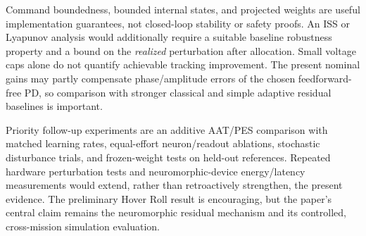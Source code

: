 \documentclass[letterpaper,10pt,conference]{IEEEtran}
\begin{document}
Command boundedness, bounded internal states, and projected weights are
useful implementation guarantees, not closed-loop stability or safety
proofs. An ISS or Lyapunov analysis would additionally require a suitable
baseline robustness property and a bound on the \emph{realized} perturbation
after allocation. Small voltage caps alone do not quantify achievable
tracking improvement. The present nominal gains may partly compensate
phase/amplitude errors of the chosen feedforward-free PD, so comparison
with stronger classical and simple adaptive residual baselines is important.

Priority follow-up experiments are an additive AAT/PES comparison with
matched learning rates, equal-effort neuron/readout ablations, stochastic
disturbance trials, and frozen-weight tests on held-out references.
Repeated hardware perturbation tests and neuromorphic-device energy/latency
measurements would extend, rather than retroactively strengthen, the
present evidence. The preliminary Hover Roll result is encouraging, but
the paper's central claim remains the neuromorphic residual mechanism and
its controlled, cross-mission simulation evaluation.



\end{document}
